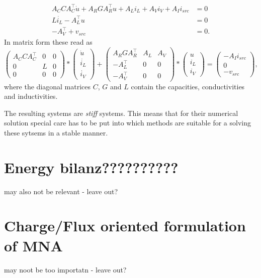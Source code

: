 \begin{displaymath}
	\begin{aligned}
		A_C C A_C^\top \dot{u} + A_R G A_R^\top u + A_L i_L + A_V i_V + A_I i_{src} &= 0 \\
		L \dot{i_L}	- A_L^\top u &= 0 \\
		-A_V^\top + v_{src} &= 0.
	\end{aligned}	
\end{displaymath}
In matrix form these read as
\begin{displaymath}
	\begin{pmatrix}
		A_C C A_C^\top & 0 & 0 \\
		0 & L & 0 \\
		0 & 0 & 0
	\end{pmatrix}
	*
	\begin{pmatrix}
		\dot{u} \\
		\dot{i_L} \\
		\dot{i_V}
	\end{pmatrix}
	+
	\begin{pmatrix}
		A_R G A_R^\top & A_L & A_V \\
		-A_L^\top & 0 & 0 \\
		-A_V^\top & 0 & 0 
	\end{pmatrix}
	*
	\begin{pmatrix}
		u \\
		i_L \\
		i_V
	\end{pmatrix}
	=
	\begin{pmatrix}
		-A_I i_{src} \\
		0 \\
		-v_{src}
	\end{pmatrix} , 
\end{displaymath}
where the diagonal matrices $C$, $G$ and $L$ contain the capacities, conductivities and inductivities.

The resulting systems are \emph{stiff} systems. This means that for their numerical solution special care has to be put into which methods are suitable for a solving these sytsems in a stable manner.

\section{Energy \textbf{bilanz??????????}}

may also not be relevant - leave out?

\section{Charge/Flux oriented formulation of MNA}
may noot be too importatn - leave out?

